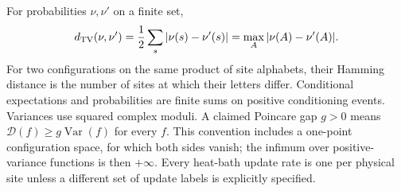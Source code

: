 For probabilities \(\nu,\nu'\) on a finite set,
\[
 d_{\rm TV}(\nu,\nu')
 =\frac12\sum_s|\nu(s)-\nu'(s)|
 =\max_A|\nu(A)-\nu'(A)|.
\]
For two configurations on the same product of site alphabets, their
Hamming distance is the number of sites at which their letters
differ. Conditional expectations and probabilities are finite sums
on positive conditioning events. Variances use squared complex
moduli. A claimed Poincare gap \(g>0\) means
\(\mathcal D(f)\ge g\operatorname{Var}(f)\) for every \(f\).
This convention includes a one-point configuration space, for which
both sides vanish; the infimum over positive-variance functions is
then \(+\infty\). Every heat-bath update rate is one per physical
site unless a different set of update labels is explicitly specified.
